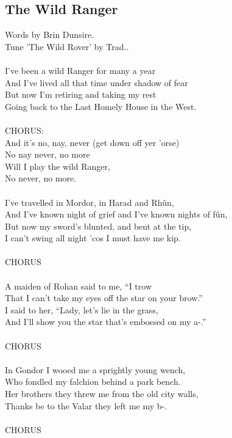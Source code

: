 \begin{multicols}{2}
\section{The Wild Ranger}
Words by Brin Dunsire.
\\Tune ’The Wild Rover’ by Trad..
\\
\\
I’ve been a wild Ranger for many a year
\\
And I’ve lived all that time under shadow of fear
\\
But now I’m retiring and taking my rest
\\
Going back to the Last Homely House in the West.
\\
\\CHORUS:
\\
And it’s no, nay, never (get down off yer ’orse)
\\
No nay never, no more
\\
Will I play the wild Ranger,
\\
No never, no more.
\\
\\
I’ve travelled in Mordor, in Harad and Rh\^un,
\\
And I’ve known night of grief and I’ve known nights of f\^un,
\\
But now my sword’s blunted, and bent at the tip,
\\
I can’t swing all night ’cos I must have me kip.
\\
\\CHORUS\\
\\
A maiden of Rohan said to me, “I trow
\\
That I can’t take my eyes off the star on your brow.”
\\
I said to her, “Lady, let’s lie in the grass,
\\
And I’ll show you the star that’s embossed on my a-.”
\\
\\CHORUS\\
\\
In Gondor I wooed me a sprightly young wench,
\\
Who fondled my falchion behind a park bench.
\\
Her brothers they threw me from the old city walls,
\\
Thanks be to the Valar they left me my b-.
\\
\\CHORUS\\

\end{multicols}
